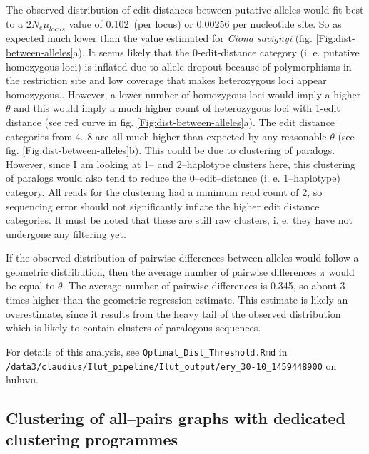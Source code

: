\documentclass{article}\usepackage[]{graphicx}\usepackage[]{color}
\begin{document}
The observed distribution of edit distances between putative alleles would fit best to a $2N_{e}\mu_{locus}$ value of 0.102~(per locus) or 0.00256 per nucleotide site. So as expected much lower than the value estimated for \textit{Ciona savignyi} (fig. \ref{Fig:dist-between-alleles}a). It seems likely that the 0-edit-distance category (i. e. putative homozygous loci) is inflated due to allele dropout because of polymorphisms in the restriction site and low coverage that makes heterozygous loci appear homozygous.. However, a lower number of homozygous loci would imply a higher $\theta$ and this would imply a much higher count of heterozygous loci with 1-edit distance (see red curve in fig. \ref{Fig:dist-between-alleles}a). The edit distance categories from 4\ldots8 are all much higher than expected by any reasonable $\theta$ (see fig. \ref{Fig:dist-between-alleles}b). This could be due to clustering of paralogs. However, since I am looking at 1-- and 2--haplotype clusters here, this clustering of paralogs would also tend to reduce the 0--edit--distance (i. e. 1--haplotype) category. All reads for the clustering had a minimum read count of 2, so sequencing error should not significantly inflate the higher edit distance categories. It must be noted that these are still raw clusters, i. e. they have not undergone any filtering yet.~

If the observed distribution of pairwise differences between alleles would follow a geometric distribution, then the average number of pairwise differences $\pi$ would be equal to $\theta$. The average number of pairwise differences is 0.345, so about 3 times higher than the geometric regression estimate. This estimate is likely an overestimate, since it results from the heavy tail of the observed distribution which is likely to contain clusters of paralogous sequences.

For details of this analysis, see \texttt{Optimal\_Dist\_Threshold.Rmd} in \\ \texttt{/data3/claudius/Ilut\_pipeline/Ilut\_output/ery\_30-10\_1459448900} on huluvu.


\subsection{Clustering of all--pairs graphs with dedicated clustering programmes}
\end{document}
